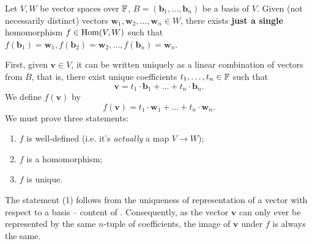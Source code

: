 \begin{theorem}{}{}
 Let $V,W$ be vector spaces over $\mathbb{F}$, $B = (\mathbf{b}_1,\ldots,\mathbf{b}_n)$
 be a basis of $V$. Given (not necessarily distinct) vectors
 $\mathbf{w}_1,\mathbf{w}_2,\ldots,\mathbf{w}_n \in W$, there exists
 \textbf{just a single} homomorphism $f \in \operatorname{Hom}(V,W)$ such that
 $f(\mathbf{b}_1) = \mathbf{w}_1, f(\mathbf{b}_2) =
 \mathbf{w}_2,\ldots,f(\mathbf{b}_n) = \mathbf{w}_n$.
\end{theorem}
\begin{thmproof}
 First, given $\mathbf{v} \in V$, it can be written uniquely as a linear
 combination of vectors from $B$, that is, there exist unique coefficients
 $t_1,\ldots,t_n \in \mathbb{F}$ such that
 \[
  \mathbf{v} = t_1 \cdot \mathbf{b}_1 + \ldots + t_n \cdot \mathbf{b}_n.
 \]
 We define $f(\mathbf{v})$ by
 \[
  f(\mathbf{v}) = t_1 \cdot \mathbf{w}_1 + \ldots + t_n \cdot \mathbf{w}_n.
 \]
 We must prove three statements:
 \begin{enumerate}
  \item $f$ is well-defined (i.e. it's \emph{actually} a map $V \to W$);
  \item $f$ is a homomorphism;
  \item $f$ is unique.
 \end{enumerate}
 The statement (1) follows from the uniqueness of representation of a vector
 with respect to a basis -- content of
 . Consequently, as the vector
 $\mathbf{v}$ can only ever be represented by the same $n$-tuple of
 coefficients, the image of $\mathbf{v}$ under $f$ is always the same.


\end{thmproof}
